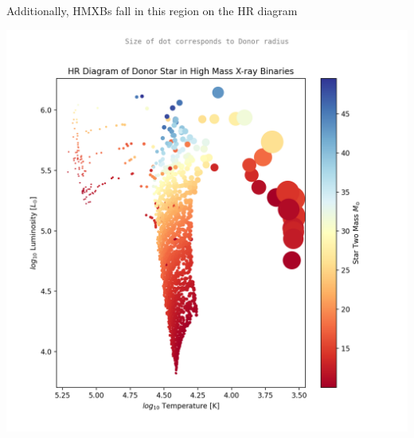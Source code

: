 \documentclass[12pt, letterpaper]{article}
\begin{document}
        Additionally, HMXBs fall in this region on the HR diagram 
        \begin{center}
            \includegraphics[scale = .5]{Figs/HR Diagram of Donor Star in High Mass Xray Binaries S2mass log10 F star radius T (2).png}
        \end{center}
  
\end{document}
